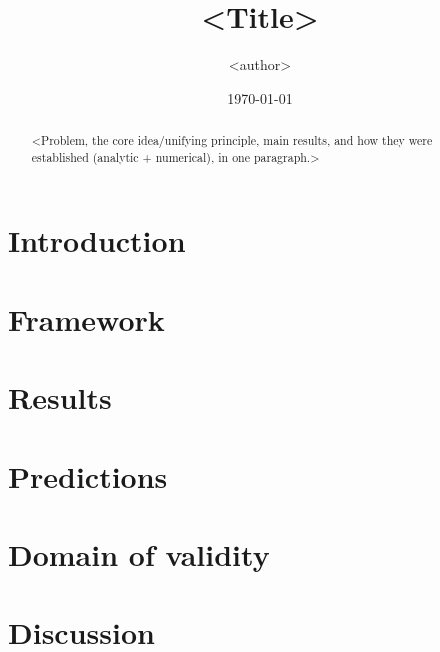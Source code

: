 \documentclass[aps,prd,reprint,nofootinbib]{revtex4-2}
\begin{document}
\title{<Title>}
\author{<author>}
\date{\today}

\begin{abstract}
<Problem, the core idea/unifying principle, main results, and how they were
established (analytic + numerical), in one paragraph.>
\end{abstract}

\maketitle

\section{Introduction}

\section{Framework}

\section{Results}

\section{Predictions}

\section{Domain of validity}

\section{Discussion}



\end{document}
